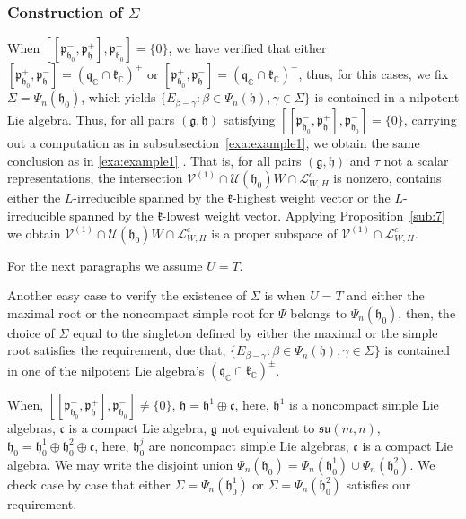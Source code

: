 \documentclass[12pt]{amsart}
\theoremstyle{definition}
\theoremstyle{remark}
\newcommand{\g}{\mathfrak{g}}
\newcommand{\h}{\mathfrak{h}}
\renewcommand{\k}{{\mathfrak k}}
\newcommand{\p}{\mathfrak p}
\newcommand{\q}{\mathfrak q}
\newcommand{\C}{{\mathbb C}}
\numberwithin{equation}{section}
\begin{document}
\subsubsection{Construction of $\Sigma$}\label{sub:comp1}When $[[ \p_{\h_0}^-,\p_\h^+ ],\p_{\h_0}^-]=\{0\}$, we have verified that either $[ \p_{\h_0}^+,\p_\h^- ]=(\q_\C \cap \k_\C)^+$ or $[ \p_{\h_0}^+,\p_\h^- ]=(\q_\C \cap \k_\C)^-$, thus, for this cases, we fix $\Sigma =\Psi_n(\h_0)$, which yields $\{E_{\beta -\gamma} : \beta \in \Psi_n(\h), \gamma \in \Sigma\}$ is contained in a nilpotent Lie algebra.   Thus, for all pairs $(\g,\h)$  satisfying $[[ \p_{\h_0}^-,\p_\h^+ ],\p_{\h_0}^-]=\{0\}$, carrying out a computation as in    subsubsection~\ref{exa:example1}, we obtain the same conclusion as in \ref{exa:example1}  . That is,  for all pairs $(\g,\h)$
and $\tau$ not a scalar representations,      the intersection   $\mathcal V^{(1)}\cap  \mathcal U(\h_0)W \cap    \mathcal L_{W,H}^c$ is nonzero, contains either the $L$-irreducible spanned by the $\k$-highest weight vector or  the $L$-irreducible spanned by the $\k$-lowest weight vector. Applying Proposition~\ref{sub:7} we obtain $\mathcal V^{(1)}\cap  \mathcal U(\h_0)W \cap    \mathcal L_{W,H}^c$ is a  proper subspace of  $\mathcal V^{(1)}\cap\mathcal L_{W,H}^c$.

For the next paragraphs we assume $U=T$.


Another easy case to verify the existence of $\Sigma$ is when $U=T$ and either the maximal root or the noncompact simple root for $\Psi$ belongs to  $\Psi_n(\h_0)$,
then, the choice of  $\Sigma$ equal to the singleton defined by  either  the maximal or the simple root   satisfies the requirement, due that, $\{E_{\beta -\gamma} :\beta \in \Psi_n(\h), \gamma \in \Sigma\}$ is contained in one of the nilpotent Lie algebra's $(\q_\C \cap \k_\C)^\pm$.

When, $[[ \p_{\h_0}^-,\p_\h^+ ],\p_{\h_0}^-]\not=\{0\}$,  $\h=\h^1 \oplus \mathfrak c $, here, $\h^1$ is a noncompact simple Lie algebras, $ \mathfrak c$ is a compact Lie algebra,   $\g $ not equivalent to $\mathfrak{su}(m,n)$, $\h_0=\h_0^1 \oplus \h_0^2 \oplus \mathfrak c $, here, $\h_0^j$ are noncompact simple Lie algebras, $ \mathfrak c$ is a compact Lie algebra. We may write the disjoint union $\Psi_n(\h_0)=\Psi_n(\h_0^1)\cup \Psi_n(\h_0^2)$. We check case by case that either $\Sigma = \Psi_n(\h_0^1)$ or $\Sigma = \Psi_n(\h_0^2)$ satisfies our requirement.

\medskip
\end{document}
